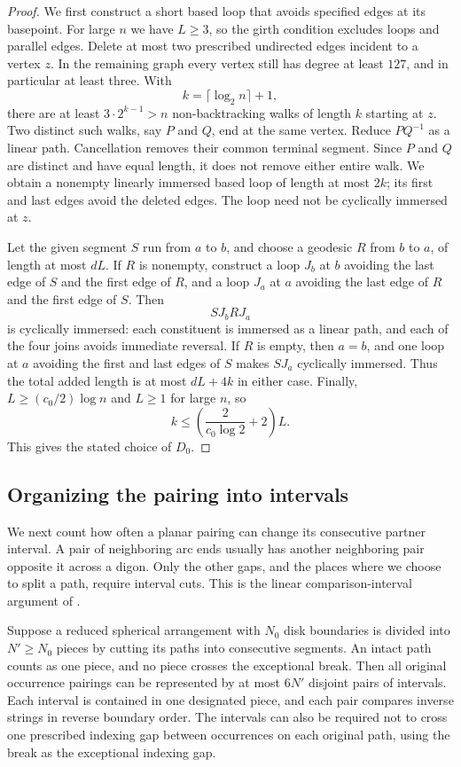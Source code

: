 \begin{proof}
We first construct a short based loop that avoids specified edges at
its basepoint.  For large $n$ we have $L\ge3$, so the girth condition
excludes loops and parallel edges.  Delete at most two prescribed
undirected edges incident to a vertex $z$.  In the remaining graph
every vertex still has degree at least $127$, and in particular at
least three.  With
\[
 k=\lceil\log_2n\rceil+1,
\]
there are at least $3\cdot2^{k-1}>n$ non-backtracking walks of length
$k$ starting at $z$.  Two distinct such walks, say $P$ and $Q$, end
at the same vertex.  Reduce $PQ^{-1}$ as a linear path.  Cancellation
removes their common terminal segment.  Since $P$ and $Q$ are distinct
and have equal length, it does not remove either entire walk.  We
obtain a nonempty linearly immersed based loop of length at most $2k$;
its first and last edges avoid the deleted edges.  The loop need not
be cyclically immersed at $z$.

Let the given segment $S$ run from $a$ to $b$, and choose a geodesic
$R$ from $b$ to $a$, of length at most $dL$.  If $R$ is nonempty,
construct a loop $J_b$ at $b$ avoiding the last edge of $S$ and the
first edge of $R$, and a loop $J_a$ at $a$ avoiding the last edge of
$R$ and the first edge of $S$.  Then
\[
 S J_b R J_a
\]
is cyclically immersed: each constituent is immersed as a linear path,
and each of the four joins avoids immediate reversal.  If $R$ is empty,
then $a=b$, and one loop at $a$ avoiding the first and last edges of
$S$ makes $SJ_a$ cyclically immersed.  Thus the total added length is
at most $dL+4k$ in either case.  Finally,
$L\ge(c_0/2)\log n$ and $L\ge1$ for large $n$, so
\[
 k\le\left(\frac{2}{c_0\log2}+2\right)L.
\]
This gives the stated choice of $D_0$.
\end{proof}

\subsection{Organizing the pairing into intervals}

We next count how often a planar pairing can change its consecutive
partner interval.  A pair of neighboring arc ends usually has another
neighboring pair opposite it across a digon.  Only the other gaps,
and the places where we choose to split a path, require interval cuts.
This is the linear comparison-interval argument of
\cite[Lemma~4.3]{OpenAI2026ZD}.

\begin{lemma}
\label{lem:paired-intervals}
Suppose a reduced spherical arrangement with $N_0$ disk boundaries is
divided into $N'\ge N_0$ pieces by cutting its paths into consecutive
segments.  An intact path counts as one piece, and no piece crosses
the exceptional break.  Then all original occurrence pairings can be
represented by at most $6N'$ disjoint pairs of intervals.  Each interval
is contained in one designated piece, and each pair compares inverse
strings in reverse boundary order.  The intervals can also be required
not to cross one prescribed indexing gap between occurrences on each
original path, using the break as the exceptional indexing gap.
\end{lemma}

